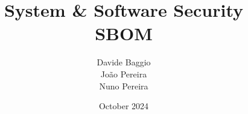 \documentclass[12pt]{article}
\title{System \& Software Security \\ SBOM}
\author{Davide Baggio \\ João Pereira \\ Nuno Pereira}
\date{October 2024}
\begin{document}
\begin{titlepage}
\maketitle
\thispagestyle{empty}

\vfill

\tableofcontents

\vfill


\end{titlepage}








\newpage
\printbibliography
\end{document}
